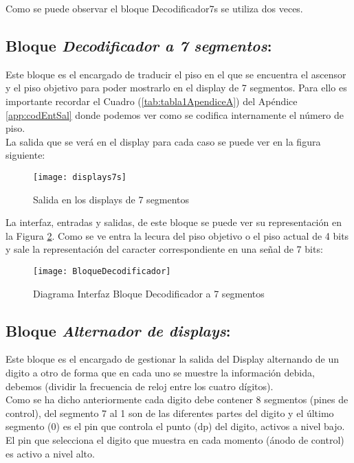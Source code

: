 	Como se puede observar el bloque Decodificador7s se utiliza dos veces. \\ 


\subsection{Bloque \textit{Decodificador a 7 segmentos}:} \label{bloque:Decodificador7s}
    Este bloque es el encargado de traducir el piso en el que se encuentra el ascensor y el piso objetivo para poder mostrarlo en el display de 7 segmentos. Para ello es importante recordar el Cuadro (\ref{tab:tabla1ApendiceA}) del Apéndice \ref{app:codEntSal} donde podemos ver como se codifica internamente el número de piso. \\ 
    
    La salida que se verá en el display para cada caso se puede ver en la figura siguiente:
    
    \begin{figure}[H]
		    \centering
		    \texttt{[image: displays7s]}
		    \caption{Salida en los displays de 7 segmentos}
		    \label{fig:displays7s}
	\end{figure}
    
    La interfaz, entradas y salidas, de este bloque se puede ver su representación en la Figura \ref{fig:BloqueDecodificador7seg}. Como se ve entra la lecura del piso objetivo o el piso actual de 4 bits y sale la representación del caracter correspondiente en una señal de 7 bits:
    
    \begin{figure}[H]
		    \centering
		    \texttt{[image: BloqueDecodificador]}
		    \caption{Diagrama Interfaz Bloque Decodificador a 7 segmentos}
		    \label{fig:BloqueDecodificador7seg}
	\end{figure}
\subsection{Bloque \textit{Alternador de displays}:} \label{bloque:AlternadorDisplay}
    Este bloque es el encargado de gestionar la salida del Display alternando de un digito a otro de forma que en cada uno se muestre la información debida, debemos (dividir la frecuencia de reloj entre los cuatro dígitos). \\
    
	Como se ha dicho anteriormente cada digito debe contener 8 segmentos (pines de control), del segmento 7 al 1 son de las diferentes partes del digito y el último segmento (0) es el pin que controla el punto (dp) del digito, activos a nivel bajo. El pin que selecciona el digito que muestra en cada momento (ánodo de control) es activo a nivel alto. \\
	

